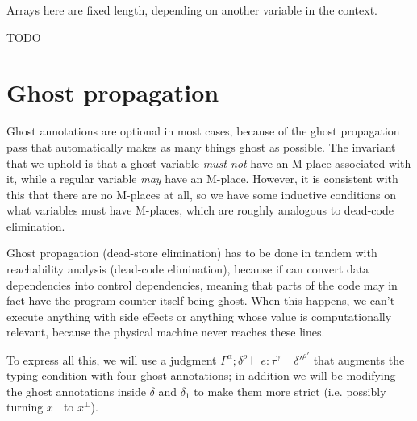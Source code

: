 \documentclass[acmsmall,nonacm]{acmart}
\DeclareMathOperator*{\Sep}{\scalerel*{\ast}{\sum}}
\newcommand*{\N}{\mathbb{N}}
\newcommand{\core}[1]{\left| #1 \right|}
\newcommand{\proves}{\vdash}
\newcommand{\makes}{\dashv}
\begin{document}
Arrays here are fixed length, depending on another variable in the context.


TODO

\section{Ghost propagation}

Ghost annotations are optional in most cases, because of the ghost propagation pass that automatically makes as many things ghost as possible. The invariant that we uphold is that a ghost variable \emph{must not} have an M-place associated with it, while a regular variable \emph{may} have an M-place. However, it is consistent with this that there are no M-places at all, so we have some inductive conditions on what variables must have M-places, which are roughly analogous to dead-code elimination.

Ghost propagation (dead-store elimination) has to be done in tandem with reachability analysis (dead-code elimination), because \textsf{if} can convert data dependencies into control dependencies, meaning that parts of the code may in fact have the program counter itself being ghost. When this happens, we can't execute anything with side effects or anything whose value is computationally relevant, because the physical machine never reaches these lines.

To express all this, we will use a judgment $\Gamma^\alpha;\delta^\rho\proves e:\tau^\gamma\makes {\delta'}^{\rho'}$ that augments the typing condition with four ghost annotations; in addition we will be modifying the ghost annotations inside $\delta$ and $\delta_1$ to make them more strict (i.e. possibly turning $x^\top$ to $x^\bot$).
\end{document}
